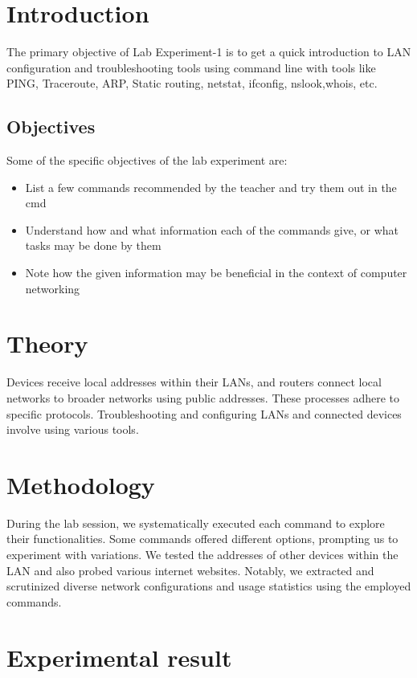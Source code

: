 \documentclass[11pt]{article}
\begin{document}
\section{Introduction}
The primary objective of Lab Experiment-1 is to get a quick introduction to LAN configuration and troubleshooting tools using command line with tools like PING, Traceroute, ARP, Static routing, netstat, ifconfig, nslook,whois, etc.

\subsection{Objectives}
Some of the specific objectives of the lab experiment are:
\begin{itemize}
    \item List a few commands recommended by the teacher and try them out in the cmd
    \item Understand how and what information each of the commands give, or what tasks may be done by them
    \item Note how the given information may be beneficial in the context of computer networking
\end{itemize}

\section{Theory}
 Devices receive local addresses within their LANs, and routers connect local networks to broader networks using public addresses. These processes adhere to specific protocols. Troubleshooting and configuring LANs and connected devices involve using various tools.


\section{Methodology}

During the lab session, we systematically executed each command to explore their functionalities. Some commands offered different options, prompting us to experiment with variations. We tested the addresses of other devices within the LAN and also probed various internet websites. Notably, we extracted and scrutinized diverse network configurations and usage statistics using the employed commands.

\newpage
\section{Experimental result}
\end{document}
